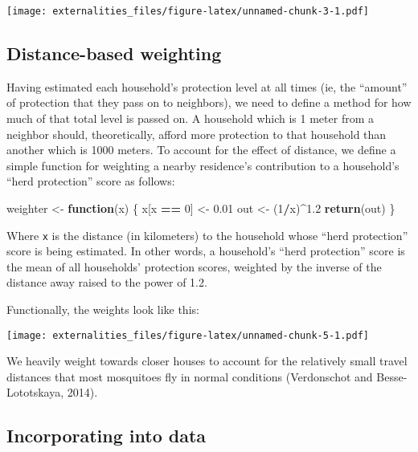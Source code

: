 \documentclass[]{article}
\newenvironment{Shaded}{\begin{snugshade}}{\end{snugshade}}
\newcommand{\KeywordTok}[1]{\textcolor[rgb]{0.13,0.29,0.53}{\textbf{#1}}}
\newcommand{\DecValTok}[1]{\textcolor[rgb]{0.00,0.00,0.81}{#1}}
\newcommand{\FloatTok}[1]{\textcolor[rgb]{0.00,0.00,0.81}{#1}}
\newcommand{\StringTok}[1]{\textcolor[rgb]{0.31,0.60,0.02}{#1}}
\newcommand{\ControlFlowTok}[1]{\textcolor[rgb]{0.13,0.29,0.53}{\textbf{#1}}}
\newcommand{\OperatorTok}[1]{\textcolor[rgb]{0.81,0.36,0.00}{\textbf{#1}}}
\newcommand{\NormalTok}[1]{#1}
\begin{document}
\texttt{[image: externalities\_files/figure-latex/unnamed-chunk-3-1.pdf]}

\subsection{Distance-based weighting}\label{distance-based-weighting}

Having estimated each household's protection level at all times (ie, the
``amount'' of protection that they pass on to neighbors), we need to
define a method for how much of that total level is passed on. A
household which is 1 meter from a neighbor should, theoretically, afford
more protection to that household than another which is 1000 meters. To
account for the effect of distance, we define a simple function for
weighting a nearby residence's contribution to a household's ``herd
protection'' score as follows:

\begin{Shaded}
\begin{Highlighting}[]
\NormalTok{weighter <-}\StringTok{ }\ControlFlowTok{function}\NormalTok{(x) \{}
\NormalTok{    x[x }\OperatorTok{==}\StringTok{ }\DecValTok{0}\NormalTok{] <-}\StringTok{ }\FloatTok{0.01}
\NormalTok{    out <-}\StringTok{ }\NormalTok{(}\DecValTok{1}\OperatorTok{/}\NormalTok{x)}\OperatorTok{^}\FloatTok{1.2}
    \KeywordTok{return}\NormalTok{(out)}
\NormalTok{\}}
\end{Highlighting}
\end{Shaded}

Where \texttt{x} is the distance (in kilometers) to the household whose
``herd protection'' score is being estimated. In other words, a
household's ``herd protection'' score is the mean of all households'
protection scores, weighted by the inverse of the distance away raised
to the power of 1.2.

Functionally, the weights look like this:

\texttt{[image: externalities\_files/figure-latex/unnamed-chunk-5-1.pdf]}

We heavily weight towards closer houses to account for the relatively
small travel distances that most mosquitoes fly in normal conditions
(Verdonschot and Besse-Lototskaya, 2014).

\subsection{Incorporating into data}\label{incorporating-into-data}
\end{document}
